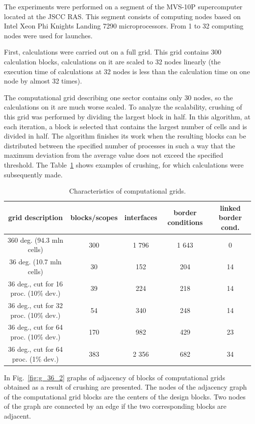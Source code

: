 \documentclass[
11pt,%
tightenlines,%
twoside,%
onecolumn,%
nofloats,%
nobibnotes,%
nofootinbib,%
superscriptaddress,%
noshowpacs,%
centertags]%
{revtex4}
\begin{document}
The experiments were performed on a segment of the MVS-10P supercomputer located at the JSCC RAS.
This segment consists of computing nodes based on Intel Xeon Phi Knights Landing 7290 microprocessors.
From 1 to 32 computing nodes were used for launches.

First, calculations were carried out on a full grid.
This grid contains 300 calculation blocks, calculations on it are scaled to 32 nodes linearly (the execution time of calculations at 32 nodes is less than the calculation time on one node by almost 32 times).

The computational grid describing one sector contains only 30 nodes, so the calculations on it are much worse scaled.
To analyze the scalability, crushing of this grid was performed by dividing the largest block in half.
In this algorithm, at each iteration, a block is selected that contains the largest number of cells and is divided in half.
The algorithm finishes its work when the resulting blocks can be distributed between the specified number of processes in such a way that the maximum deviation from the average value does not exceed the specified threshold.
The Table~\ref{tab:grids} shows examples of crushing, for which calculations were subsequently made.

\begin{table}[!h]
\setcaptionmargin{0mm}
\onelinecaptionsfalse
{}
\caption{Characteristics of computational grids.}
\bigskip
\begin{tabular}{|c|c|c|c|c|}
\hline
grid description & blocks/scopes & interfaces & border conditions & linked border cond. \\
\hline
360 deg. (94.3 mln cells) & 300 & 1 796 & 1 643 & 0 \\
36 deg. (10.7 mln cells) & 30 & 152 & 204 & 14 \\
\hline
36 deg., cut for 16 proc. (10\% dev.) & 39 & 224 & 218 & 14 \\
36 deg., cut for 32 proc. (10\% dev.) & 54 & 340 & 248 & 14 \\
36 deg., cut for 64 proc. (10\% dev.) & 170 & 982 & 429 & 23 \\
\hline
36 deg., cut for 64 proc. (1\% dev.) & 383 & 2 356 & 682 & 34 \\
\hline
\end{tabular}
\label{tab:grids}
\end{table}

In Fig.~\ref{fig:g_36_2} graphs of adjacency of blocks of computational grids obtained as a result of crushing are presented.
The nodes of the adjacency graph of the computational grid blocks are the centers of the design blocks.
Two nodes of the graph are connected by an edge if the two corresponding blocks are adjacent.
\end{document}
